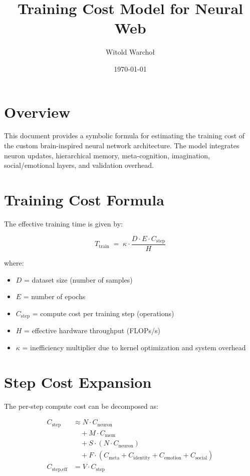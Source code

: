 \documentclass{article}
\title{Training Cost Model for Neural Web}
\author{Witold Warchoł}
\date{\today}
\begin{document}
\maketitle

\section{Overview}
This document provides a symbolic formula for estimating the training cost of the custom brain-inspired neural network architecture. The model integrates neuron updates, hierarchical memory, meta-cognition, imagination, social/emotional layers, and validation overhead.

\section{Training Cost Formula}
The effective training time is given by:

\begin{equation}
T_{\text{train}} \;=\; 
\kappa \cdot \frac{D \cdot E \cdot C_{\text{step}}}{H}
\end{equation}

where:
\begin{itemize}
    \item $D$ = dataset size (number of samples)
    \item $E$ = number of epochs
    \item $C_{\text{step}}$ = compute cost per training step (operations)
    \item $H$ = effective hardware throughput (FLOPs/s)
    \item $\kappa$ = inefficiency multiplier due to kernel optimization and system overhead
\end{itemize}

\section{Step Cost Expansion}
The per-step compute cost can be decomposed as:

\begin{align}
C_{\text{step}} &\approx N \cdot C_{\text{neuron}} \nonumber \\
&\quad + M \cdot C_{\text{mem}} \nonumber \\
&\quad + S \cdot (N \cdot C_{\text{neuron}}) \nonumber \\
&\quad + F \cdot (C_{\text{meta}} + C_{\text{identity}} + C_{\text{emotion}} + C_{\text{social}}) \\
C_{\text{step,eff}} &= V \cdot C_{\text{step}}
\end{align}
\end{document}
